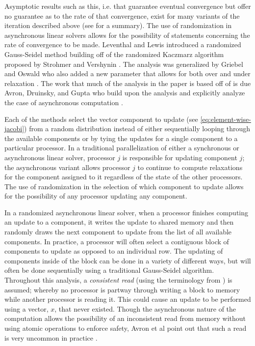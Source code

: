 \documentclass{article}
\theoremstyle{definition}
\theoremstyle{example}
\theoremstyle{example}
\theoremstyle{example}
\begin{document}
Asymptotic results such as this, i.e. that guarantee eventual convergence but offer no guarantee as to the rate of that convergence, exist for many variants of the iteration described above (see \cite{frommer2000asynchronous} for a summary). The use of randomization in asynchronous linear solvers allows for the possibility of statements concerning the rate of convergence to be made. Leventhal and Lewis introduced a randomized Gauss-Seidel method \cite{leventhal2010randomized} building off of the randomized Kaczmarz algorithm proposed by Strohmer and Vershynin \cite{strohmer2009randomized}. The analysis was generalized by Griebel and Oswald who also added a new parameter that allows for both over and under relaxation \cite{griebel2012greedy}. The work that much of the analysis in the paper is based off of is due Avron, Druinsky, and Gupta who build upon the analysis and explicitly analyze the case of asynchronous computation \cite{avron2015revisiting}.  

Each of the methods select the vector component to update (see \cref{eq:element-wise-jacobi}) from a random distribution instead of either sequentially looping through the available components or by tying the updates for a single component to a particular processor. In a traditional parallelization of either a synchronous or asynchronous linear solver, processor $j$ is responsible for updating component $j$; the asynchronous variant allows processor $j$ to continue to compute relaxations for the component assigned to it regardless of the state of the other processors. The use of randomization in the selection of which component to update allows for the possibility of any processor updating any component.

In a randomized asynchronous linear solver, when a processor finishes computing an update to a component, it writes the update to shared memory and then randomly draws the next component to update from the list of all available components. In practice, a processor will often select a contiguous block of components to update as opposed to an individual row. The updating of components inside of the block can be done in a variety of different ways, but will often be done sequentially using a traditional Gauss-Seidel algorithm. Throughout this analysis, a {\em consistent read} (using the terminology from \cite{avron2015revisiting}) is assumed; whereby no processor is partway through writing a block to memory while another processor is reading it. This could cause an update to be performed using a vector, $x$, that never existed. Though the asynchronous nature of the computation allows the possibility of an inconsistent read from memory without using atomic operations to enforce safety, Avron et al point out that such a read is very uncommon in practice \cite{avron2015revisiting}.
\end{document}
